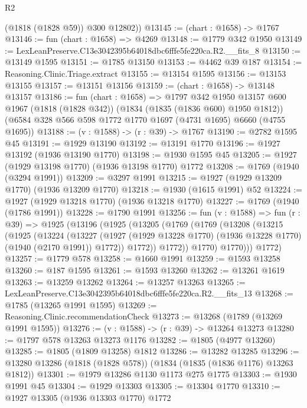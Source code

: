 \begin{lexlean}{R2}
\begin{coremodule}
        (@1818 (@1828 @59))
        @300
        @12802))
@13145 := (chart : @1658) -> @1767
@13146 := fun (chart : @1658) => @4269
@13148 := @1779 @342 @1950
@13149 := LexLeanPreserve.C13e3042395b64018dbc6fffe5fe220ca.R2.__fits_8
@13150 := @13149 @1595
@13151 := @1785 @13150
@13153 := @4462 @39 @187
@13154 := Reasoning.Clinic.Triage.extract
@13155 := @13154 @1595
@13156 := @13153 @13155
@13157 := @13151 @13156
@13159 := (chart : @1658) -> @13148 @13157
@13186 := fun (chart : @1658) =>
  @1797
    @342
    @1950
    @13157
    @600
    @1967
    (@1818 (@1828 @342))
    (@1834 (@1835 (@1836 @600) @1950 @1812))
    (@6584 @328 @566 @598 @1772 @1770 @1697 (@4731 @1695) @6660 (@4755 @1695))
@13188 := (v : @1588) -> (r : @39) -> @1767
@13190 := @2782 @1595 @45
@13191 := @1929 @13190
@13192 := @13191 @1770
@13196 := @1927 @13192 (@1936 @13190 @1770)
@13198 := @1930 @1595 @45
@13205 := @1927 (@1929 @13198 @1770) (@1936 @13198 @1770) @1772
@13208 := @1769 (@1940 (@3294 @1991))
@13209 := @3297 @1991
@13215 := @1927 (@1929 @13209 @1770) (@1936 @13209 @1770)
@13218 := @1930 (@1615 @1991) @52
@13224 := @1927 (@1929 @13218 @1770) (@1936 @13218 @1770)
@13227 := @1769 (@1940 (@1786 @1991))
@13228 := @1790 @1991
@13256 := fun (v : @1588) =>
  fun (r : @39) =>
  @1925
    (@13196
      (@1925
        (@13205
          (@1769
            (@1769
              (@13208
                (@13215
                  (@1925
                    (@13224
                      (@13227
                        (@1927
                          (@1929 @13228 @1770)
                          (@1936 @13228 @1770)
                          (@1940 (@2170 @1991))
                          @1772))
                      @1772))
                  @1772))
              @1770)
            @1770)))
      @1772)
@13257 := @1779 @578
@13258 := @1660 @1991
@13259 := @1593 @13258
@13260 := @187 @1595
@13261 := @1593 @13260
@13262 := @13261 @1619
@13263 := @13259 @13262
@13264 := @13257 @13263
@13265 := LexLeanPreserve.C13e3042395b64018dbc6fffe5fe220ca.R2.__fits_13
@13268 := @1785 (@13265 @1991 @1595)
@13269 := Reasoning.Clinic.recommendationCheck
@13273 := @13268 (@1789 (@13269 @1991 @1595))
@13276 := (v : @1588) -> (r : @39) -> @13264 @13273
@13280 := @1797 @578 @13263 @13273 @1176
@13282 := @1805 (@4977 @13260)
@13285 := @1805 (@1809 @13258) @1812
@13286 := @13282 @13285
@13296 := @13280 @13286 (@1818 (@1828 @578)) (@1834 (@1835 (@1836 @1176) @13263 @1812))
@13301 := @1979 @13286 @1130 @1173 @275 @1775
@13303 := @1930 @1991 @45
@13304 := @1929 @13303
@13305 := @13304 @1770
@13310 := @1927 @13305 (@1936 @13303 @1770) @1772

\end{coremodule}
\end{lexlean}
